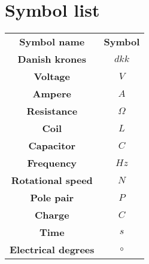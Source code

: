 \section{Symbol list}

\begin{center}
\begin{tabular}{|c|c|} \cline{1-2}
\textbf{Symbol name} & \textbf{Symbol} \\ \cline{1-2}
\textbf{Danish krones} & $dkk$ \\ \cline{1-2}
\textbf{Voltage} & $V$ \\ \cline{1-2}
\textbf{Ampere} & $A$ \\ \cline{1-2}
\textbf{Resistance} & $\Omega$ \\ \cline{1-2}
\textbf{Coil} & $L$ \\ \cline{1-2}
\textbf{Capacitor} & $C$ \\ \cline{1-2}
\textbf{Frequency} & $Hz$\\ \cline{1-2} 
\textbf{Rotational speed} & $N$ \\ \cline{1-2}
\textbf{Pole pair} & $P$ \\ \cline{1-2}
\textbf{Charge} & $C$ \\ \cline{1-2}
\textbf{Time} & $s$ \\ \cline{1-2}
\textbf{Electrical degrees} & $\circ$ \\ \cline{1-2}
\end{tabular}
\end{center}
